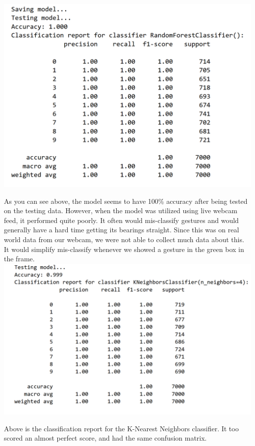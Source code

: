 \documentclass[letterpaper]{article} %
\begin{document}
\includegraphics[scale=0.65]{complex-rfc-report}

As you can see above, the model seems to have 100\% accuracy after being tested on the testing data. However, when the model was utilized using live webcam feed, it performed quite poorly. It often would mis-classify gestures and would generally have a hard time getting its bearings straight. Since this was on real world data from our webcam, we were not able to collect much data about this. It would simplify mis-classify whenever we showed a gesture in the green box in the frame.
\\

\includegraphics[scale=0.6]{complex-knn-report}

Above is the classification report for the K-Nearest Neighbors classifier. It too scored an almost perfect score, and had the same confusion matrix.
\end{document}
